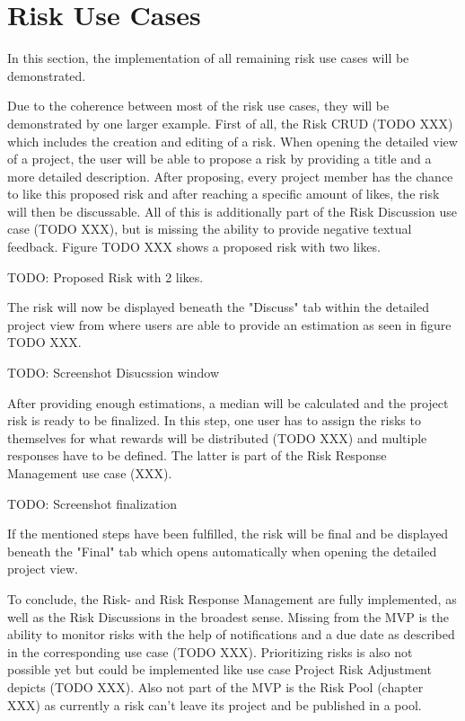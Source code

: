 
\section{Risk Use Cases}
\label{sec:implementationRisks}

In this section, the implementation of all remaining risk use cases will be demonstrated.

Due to the coherence between most of the risk use cases, they will be demonstrated by one larger example. First of all, the Risk CRUD (TODO XXX) which includes the creation and editing of a risk. When opening the detailed view of a project, the user will be able to propose a risk by providing a title and a more detailed description. After proposing, every project member has the chance to like this proposed risk and after reaching a specific amount of likes, the risk will then be discussable. All of this is additionally part of the Risk Discussion use case (TODO XXX), but is missing the ability to provide negative textual feedback. Figure TODO XXX shows a proposed risk with two likes.

TODO: Proposed Risk with 2 likes.


The risk will now be displayed beneath the "Discuss" tab within the detailed project view from where users are able to provide an estimation as seen in figure TODO XXX.

TODO: Screenshot Disucssion window

After providing enough estimations, a median will be calculated and the project risk is ready to be finalized. In this step, one user has to assign the risks to themselves for what rewards will be distributed (TODO XXX) and multiple responses have to be defined. The latter is part of the Risk Response Management use case (XXX).

TODO: Screenshot finalization

If the mentioned steps have been fulfilled, the risk will be final and be displayed beneath the "Final" tab which opens automatically when opening the detailed project view.

To conclude, the Risk- and Risk Response Management are fully implemented, as well as the Risk Discussions in the broadest sense. Missing from the MVP is the ability to monitor risks with the help of notifications and a due date as described in the corresponding use case (TODO XXX). Prioritizing risks is also not possible yet but could be implemented like use case Project Risk Adjustment depicts (TODO XXX). Also not part of the MVP is the Risk Pool (chapter XXX) as currently a risk can’t leave its project and be published in a pool.